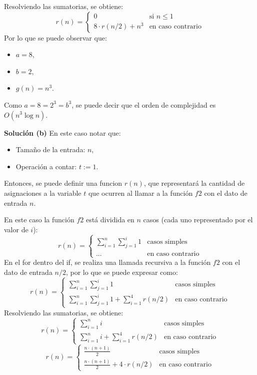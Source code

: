 Resolviendo las sumatorias, se obtiene:
\begin{equation*}
    r(n) = 
    \begin{cases}
        0 & \text{si } n \leq 1 \\
        8 \cdot r(n/2) + n^3 & \text{en caso contrario}
    \end{cases}
\end{equation*}
Por lo que se puede observar que:
\begin{itemize}
    \item $a = 8$,
    \item $b = 2$,
    \item $g(n) = n^3$.
\end{itemize}
Como $a = 8 = 2^3 = b^3$, se puede decir que el orden de complejidad es $O(n^3 \log n)$.

\textbf{Solución (b)}
En este caso notar que:
\begin{itemize}
    \item Tamaño de la entrada: $n$,
    \item Operación a contar: $t := 1$.
\end{itemize}
Entonces, se puede definir una funcion $r(n)$, que representará la cantidad de asignaciones a la variable $t$ que ocurren al llamar a la función $f2$ con el dato de entrada $n$.

En este caso la función $f2$ está dividida en $n$ casos (cada uno representado por el valor de $i$):
\begin{equation*}
    r(n) = 
    \begin{cases}
        \sum_{i=1}^{n} \sum_{j=1}^{i} 1 & \text{casos simples }  \\
        ... & \text{en caso contrario}
    \end{cases}
\end{equation*}
En el for dentro del if, se realiza una llamada recursiva a la función $f2$ con el dato de entrada $n/2$, por lo que se puede expresar como:
\begin{equation*}
    r(n) = 
    \begin{cases}
        \sum_{i=1}^{n} \sum_{j=1}^{i} 1 & \text{casos simples }  \\
        \sum_{i=1}^{n} \sum_{j=1}^{i} 1 +  \sum_{i=1}^{4} r(n/2) & \text{en caso contrario}
    \end{cases}
\end{equation*}
Resolviendo las sumatorias, se obtiene:
\begin{equation*}
    r(n) = 
    \begin{cases}
        \sum_{i=1}^{n} i & \text{casos simples }  \\
        \sum_{i=1}^{n} i +  \sum_{i=1}^{4} r(n/2) & \text{en caso contrario}
    \end{cases}
\end{equation*}
\begin{equation*}
    r(n) = 
    \begin{cases}
        \frac{n\cdot (n+1)}{2} & \text{casos simples }  \\
        \frac{n\cdot (n+1)}{2} + 4 \cdot r(n/2) & \text{en caso contrario}
    \end{cases}
\end{equation*}

